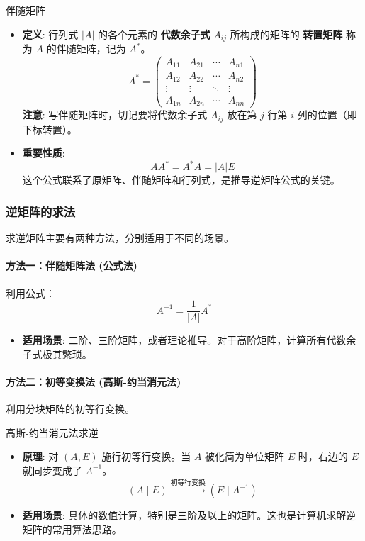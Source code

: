 \documentclass[a4paper,12pt]{ctexart}
\begin{document}
\begin{mydef}{伴随矩阵}{}
\begin{itemize}
    \item \textbf{定义}: 行列式 $|A|$ 的各个元素的 \textbf{代数余子式} $A_{ij}$ 所构成的矩阵的 \textbf{转置矩阵} 称为 $A$ 的伴随矩阵，记为 $A^*$。
    \[
    A^* = 
    \begin{pmatrix}
    A_{11} & A_{21} & \cdots & A_{n1} \\
    A_{12} & A_{22} & \cdots & A_{n2} \\
    \vdots & \vdots & \ddots & \vdots \\
    A_{1n} & A_{2n} & \cdots & A_{nn}
    \end{pmatrix}
    \]
    \textbf{注意}: 写伴随矩阵时，切记要将代数余子式 $A_{ij}$ 放在第 $j$ 行第 $i$ 列的位置（即下标转置）。
    
    \item \textbf{重要性质}: 
    \[AA^* = A^*A = |A|E\]
    这个公式联系了原矩阵、伴随矩阵和行列式，是推导逆矩阵公式的关键。
\end{itemize}
\end{mydef}

\subsubsection{逆矩阵的求法}
求逆矩阵主要有两种方法，分别适用于不同的场景。

\paragraph{方法一：伴随矩阵法 (公式法)}
利用公式：
\[
A^{-1} = \frac{1}{|A|} A^*
\]
\begin{itemize}
    \item \textbf{适用场景}: 二阶、三阶矩阵，或者理论推导。对于高阶矩阵，计算所有代数余子式极其繁琐。
\end{itemize}

\paragraph{方法二：初等变换法 (高斯-约当消元法)}
利用分块矩阵的初等行变换。
\begin{myalgo}{高斯-约当消元法求逆}{}
\begin{itemize}
    \item \textbf{原理}: 对 $(A, E)$ 施行初等行变换。当 $A$ 被化简为单位矩阵 $E$ 时，右边的 $E$ 就同步变成了 $A^{-1}$。
    \[
    (A \mid E) \xrightarrow{\text{初等行变换}} (E \mid A^{-1})
    \]
    \item \textbf{适用场景}: 具体的数值计算，特别是三阶及以上的矩阵。这也是计算机求解逆矩阵的常用算法思路。
\end{itemize}
\end{myalgo}
\end{document}
